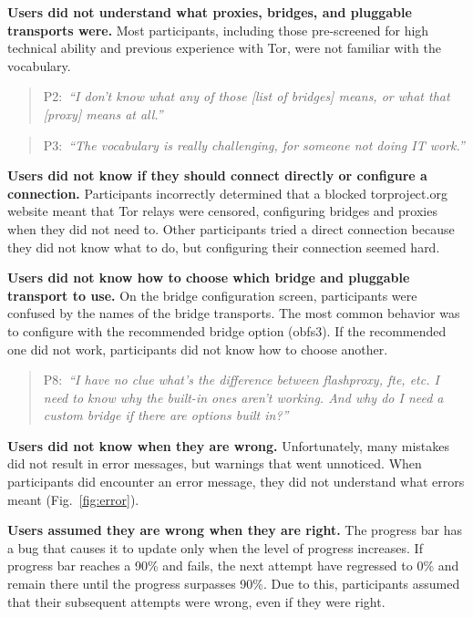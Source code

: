 \documentclass[USenglish,oneside,twocolumn]{article}
\newcommand{\pquote}[2]{
\begin{quotation}
\noindent #1:~\textit{``#2''}
\end{quotation}
}
\begin{document}
{\begin{description}
\item {\bfseries Users did not understand what proxies, bridges, and pluggable transports were.}
Most participants, including those pre-screened for high technical ability and previous experience with Tor, were not familiar with the vocabulary.

\smallskip
\pquote{P2}{I don't know what any of those [list of bridges] means, or what that [proxy] means at all.}
\smallskip
\pquote{P3}{The vocabulary is really challenging, for someone not doing IT work.}
\smallskip

\item {\bfseries Users did not know if they should connect directly or configure a connection.}
Participants incorrectly determined that a blocked torproject.org website meant that Tor relays were censored, configuring bridges and proxies when they did not need to. Other participants tried a direct connection because they did not know what to do, but configuring their connection seemed hard. 

\item {\bfseries Users did not know how to choose which bridge and pluggable transport to use.}
On the bridge configuration screen, participants were confused by the names of the bridge transports. The most common behavior was to configure with the recommended bridge option (obfs3). If the recommended one did not work, participants did not know how to choose another. 

\smallskip
\pquote{P8}{I have no clue what's the difference between flashproxy, fte, etc. I need to know why the built-in ones aren't working. And why do I need a custom bridge if there are options built in?}
\smallskip

\item {\bfseries Users did not know when they are wrong.}
Unfortunately, many mistakes did not result in error messages, but warnings that went unnoticed.
When participants did encounter an error message, they did not understand what errors meant (Fig.~\ref{fig:error}).

\item {\bfseries Users assumed they are wrong when they are right.}
The progress bar has a bug that causes it to update only when the level of progress increases.
If progress bar reaches a 90\% and fails, the next attempt have regressed to 0\% and remain there until the progress surpasses 90\%. Due to this, participants assumed that their subsequent attempts were wrong, even if they were right.


\end{description}}
\end{document}
